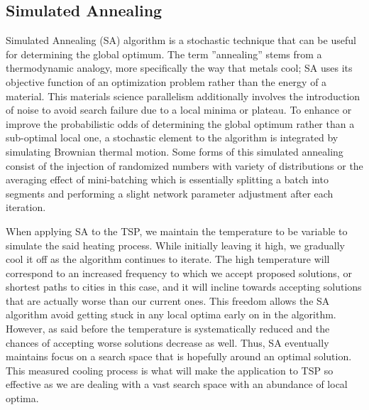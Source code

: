 \documentclass{article}
\begin{document}
\subsection{Simulated Annealing}
Simulated Annealing (SA) algorithm is a stochastic technique that can be useful for determining the global optimum. The term ”annealing” stems from a thermodynamic analogy, more specifically the way that metals cool; SA uses its objective function of an optimization problem rather than the energy of a material. This materials science parallelism additionally involves the introduction of noise to avoid search failure due to a local minima or plateau. To enhance or improve the probabilistic odds of determining the global optimum rather than a sub-optimal local one, a stochastic element to the algorithm is integrated by simulating Brownian thermal motion. Some forms of this simulated annealing consist of the injection of randomized numbers with variety of distributions or the averaging effect of mini-batching which is essentially splitting a batch into segments and performing a slight network parameter adjustment after each iteration. \\
\par When applying SA to the TSP, we maintain the temperature to be variable to simulate the said heating process. While initially leaving it high, we gradually cool it off as the algorithm continues to iterate. The high temperature will correspond to an increased frequency to which we accept proposed solutions, or shortest paths to cities in this case, and it will incline towards accepting solutions that are actually worse than our current ones. This freedom allows the SA algorithm avoid getting stuck in any local optima early on in the algorithm. However, as said before the temperature is systematically reduced and the chances of accepting worse solutions decrease as well. Thus, SA eventually maintains focus on a search space that is hopefully around an optimal solution. This measured cooling process is what will make the application to TSP so effective as we are dealing with a vast search space with an abundance of local optima. 
\end{document}
